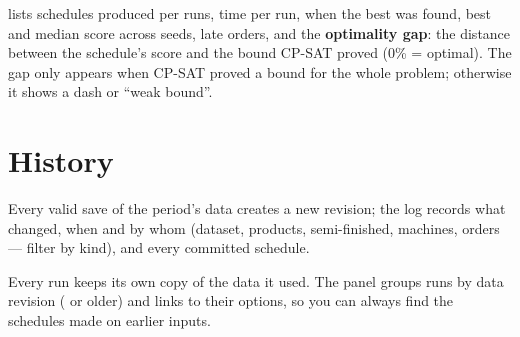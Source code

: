  lists schedules produced per runs, time per run, when the best was found,
best and median score across seeds, late orders, and the \textbf{optimality gap}: the distance between the
schedule's score and the bound CP-SAT proved (0\% = optimal). The gap only appears when CP-SAT proved a bound
for the whole problem; otherwise it shows a dash or ``weak bound''.

\section{History}


\begin{description}[style=nextline, leftmargin=1.2em, font=\bfseries\color{brand}]
  \item[Change log] Every valid save of the period's data creates a new revision; the log records what changed,
        when and by whom (dataset, products, semi-finished, machines, orders --- filter by kind), and every
        committed schedule.
  \item[Runs by data version] Every run keeps its own copy of the data it used. The panel groups runs by data
        revision ( or older) and links to their options, so you can always find the schedules made
        on earlier inputs.
\end{description}
